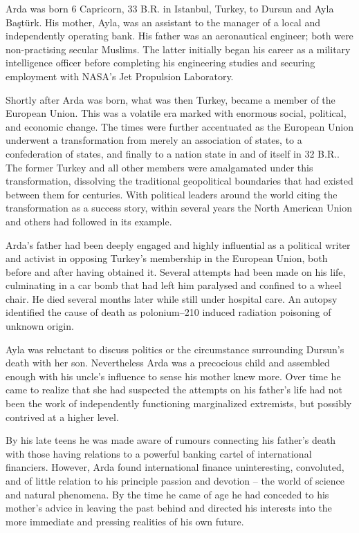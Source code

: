 Arda was born 6 Capricorn, 33 B.R. in Istanbul, Turkey, to Dursun and Ayla Baştürk. His mother, Ayla, was an assistant to the manager of a local and independently operating bank. His father was an aeronautical engineer; both were non-practising secular Muslims. The latter initially began his career as a military intelligence officer before completing his engineering studies and securing employment with NASA's Jet Propulsion Laboratory.

Shortly after Arda was born, what was then Turkey, became a member of the European Union. This was a volatile era marked with enormous social, political, and economic change. The times were further accentuated as the European Union underwent a transformation from merely an association of states, to a confederation of states, and finally to a nation state in and of itself in 32 B.R.. The former Turkey and all other members were amalgamated under this transformation, dissolving the traditional geopolitical boundaries that had existed between them for centuries. With political leaders around the world citing the transformation as a success story, within several years the North American Union and others had followed in its example.

Arda's father had been deeply engaged and highly influential as a political writer and activist in opposing Turkey's membership in the European Union, both before and after having obtained it. Several attempts had been made on his life, culminating in a car bomb that had left him paralysed and confined to a wheel chair. He died several months later while still under hospital care. An autopsy identified the cause of death as polonium--210 induced radiation poisoning of unknown origin. 

Ayla was reluctant to discuss politics or the circumstance surrounding Dursun's death with her son. Nevertheless Arda was a precocious child and assembled enough with his uncle's influence to sense his mother knew more. Over time he came to realize that she had suspected the attempts on his father's life had not been the work of independently functioning marginalized extremists, but possibly contrived at a higher level.

By his late teens he was made aware of rumours connecting his father's death with those having relations to a powerful banking cartel of international financiers. However, Arda found international finance uninteresting, convoluted, and of little relation to his principle passion and devotion -- the world of science and natural phenomena. By the time he came of age he had conceded to his mother's advice in leaving the past behind and directed his interests into the more immediate and pressing realities of his own future.

